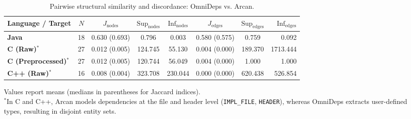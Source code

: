 \begin{table}[htpb]
  \centering
  \small
  \caption{Pairwise structural similarity and discordance: OmniDeps vs. Arcan.}
  \label{tab:results_arcan}
  \vspace{0.4em}
  \begin{adjustbox}{max width=\textwidth}
    \begin{tabular}{lccccccr}
      \toprule
      \textbf{Language / Target} & $N$ & $J_{\text{nodes}}$ &
      $\text{Sup}_{\text{nodes}}$ & $\text{Inf}_{\text{nodes}}$ &
      $J_{\text{edges}}$ & $\text{Sup}_{\text{edges}}$ &
      $\text{Inf}_{\text{edges}}$ \\
      \midrule
      \textbf{Java}                 & 18 & 0.630 (0.693) & 0.796   &
      0.003  & 0.580 (0.575) & 0.759   & 0.092 \\
      \textbf{C (Raw)}$^*$          & 27 & 0.012 (0.005) & 124.745 &
      55.130 & 0.004 (0.000) & 189.370 & 1713.444 \\
      \textbf{C (Preprocessed)}$^*$ & 27 & 0.012 (0.005) & 120.744 &
      56.049 & 0.004 (0.000) & 1.000   & 1.000 \\
      \textbf{C++ (Raw)}$^*$        & 16 & 0.008 (0.004) & 323.708 &
      230.044 & 0.000 (0.000) & 620.438 & 526.854 \\
      \bottomrule
    \end{tabular}
  \end{adjustbox}
  \vspace{0.2em}
  \footnotesize
  Values report means (medians in parentheses for Jaccard indices).\\
  $^*$In C and C++, Arcan models dependencies at the file
  and header level (\texttt{IMPL\_FILE}, \texttt{HEADER}), whereas
  OmniDeps extracts user-defined types, resulting in disjoint entity sets.
\end{table}

